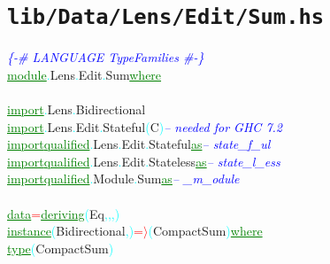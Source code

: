 \section{\texttt{lib/Data/Lens/Edit/Sum.hs}}
\label{mod:Data.Lens.Edit.Sum}
\textcolor{blue}{{\it{}\{-\# LANGUAGE TypeFamilies \#-\}}}\\\textcolor{green}{\underline{module}}\textcolor{cyan}{.}{\rm{}Lens}\textcolor{cyan}{.}{\rm{}Edit}\textcolor{cyan}{.}{\rm{}Sum}\hsspace \textcolor{green}{\underline{where}}\\\\\textcolor{green}{\underline{import}}\textcolor{cyan}{.}{\rm{}Lens}\textcolor{cyan}{.}{\rm{}Bidirectional}\\\textcolor{green}{\underline{import}}\textcolor{cyan}{.}{\rm{}Lens}\textcolor{cyan}{.}{\rm{}Edit}\textcolor{cyan}{.}{\rm{}Stateful}\hsspace \textcolor{cyan}{(}{\rm{}C}\textcolor{cyan}{)}\hsspace \textcolor{blue}{{\it{}-- needed for GHC 7.2}}\\\textcolor{green}{\underline{import}}\hsspace \textcolor{green}{\underline{qualified}}\textcolor{cyan}{.}{\rm{}Lens}\textcolor{cyan}{.}{\rm{}Edit}\textcolor{cyan}{.}{\rm{}Stateful}\hsspace \hsspace \textcolor{green}{\underline{as}}\hsspace \textcolor{blue}{{\it{}-- state\_f\_ul}}\\\textcolor{green}{\underline{import}}\hsspace \textcolor{green}{\underline{qualified}}\textcolor{cyan}{.}{\rm{}Lens}\textcolor{cyan}{.}{\rm{}Edit}\textcolor{cyan}{.}{\rm{}Stateless}\hsspace \textcolor{green}{\underline{as}}\hsspace \textcolor{blue}{{\it{}-- state\_l\_ess}}\\\textcolor{green}{\underline{import}}\hsspace \textcolor{green}{\underline{qualified}}\textcolor{cyan}{.}{\rm{}Module}\textcolor{cyan}{.}{\rm{}Sum}\hsspace \hsspace \hsspace \hsspace \hsspace \hsspace \hsspace \hsspace \hsspace \hsspace \textcolor{green}{\underline{as}}\hsspace \textcolor{blue}{{\it{}-- \_m\_odule}}\\\\\textcolor{green}{\underline{data}}\hsspace \textcolor{red}{=}\hsspace \textcolor{green}{\underline{deriving}}\hsspace \textcolor{cyan}{(}{\rm{}Eq}\textcolor{cyan}{,}\textcolor{cyan}{,}\textcolor{cyan}{,}\textcolor{cyan}{)}\\\textcolor{green}{\underline{instance}}\hsspace \textcolor{cyan}{(}{\rm{}Bidirectional}\textcolor{cyan}{,}\textcolor{cyan}{)}\hsspace \textcolor{red}{=\ensuremath{\rangle}}\hsspace \textcolor{cyan}{(}{\rm{}CompactSum}\textcolor{cyan}{)}\hsspace \textcolor{green}{\underline{where}}\\\hstab \textcolor{green}{\underline{type}}\hsspace \textcolor{cyan}{(}{\rm{}CompactSum}\textcolor{cyan}{)}\hsspace 
